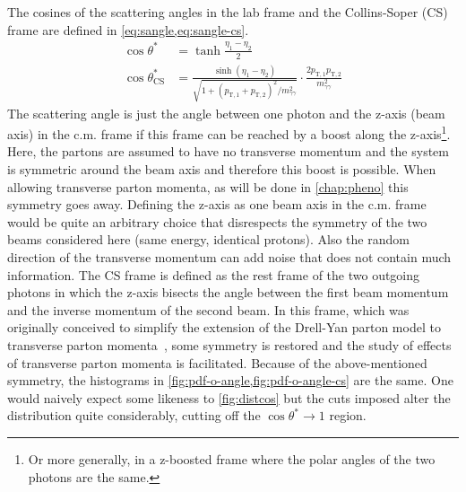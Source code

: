 The cosines of the scattering angles in the lab frame and the
Collins-Soper (CS) frame are defined in
\cref{eq:sangle,eq:sangle-cs}.
%
\begin{align}
  \cos\theta^\ast &= \tanh\frac{\eta_1 - \eta_2}{2} \label{eq:sangle}\\
  \cos\theta^*_\text{CS} &= \frac{\sinh(\eta_1 -
                           \eta_2)}{\sqrt{1+(p_{\text{T},1} + p_{\text{T},2})^2/m_{\gamma\gamma}^2}}\cdot
                          \frac{2p_{\text{T},1}p_{\text{T},2}}{m_{\gamma\gamma}^2}\label{eq:sangle-cs}
\end{align}
%
The scattering angle is just the angle
between one photon and the z-axis (beam axis) in the c.m. frame if
this frame can be reached by a boost along the z-axis\footnote{Or more
  generally, in a z-boosted frame where the polar angles of the two
  photons are the same.}. Here, the partons are assumed to have no
transverse momentum and the system is symmetric around the beam axis
and therefore this boost is possible. When allowing transverse parton
momenta, as will be done in \cref{chap:pheno} this symmetry goes
away. Defining the z-axis as one beam axis in the c.m. frame would be
quite an arbitrary choice that disrespects the symmetry of the two
beams considered here (same energy, identical protons).  Also the
random direction of the transverse momentum can add noise that does
not contain much information. The CS frame is defined as the rest
frame of the two outgoing photons in which the z-axis bisects the
angle between the first beam momentum and the inverse momentum of the
second beam. In this frame, which was originally conceived to simplify
the extension of the Drell-Yan parton model to transverse parton
momenta~\cite{collins:1977an}, some symmetry is restored and the study
of effects of transverse parton momenta is facilitated. Because of the
above-mentioned symmetry, the histograms in
\cref{fig:pdf-o-angle,fig:pdf-o-angle-cs} are the same. One would
naively expect some likeness to \cref{fig:distcos} but the cuts
imposed alter the distribution quite considerably, cutting off the
\(\cos\theta^\ast\rightarrow 1\) region.
%
